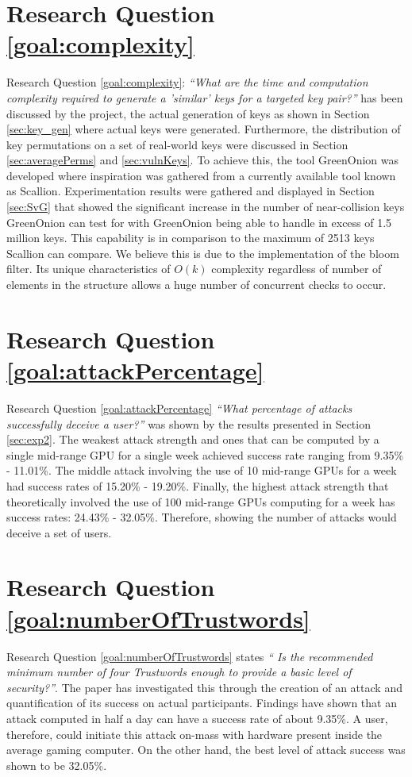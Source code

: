 \section{Research Question \ref{goal:complexity}}
Research Question \ref{goal:complexity}: \textit{``What are the time and computation complexity required to generate a ’similar’ keys for a targeted key pair?''} has been discussed by the project, the actual generation of keys as shown in Section \ref{sec:key_gen} where actual keys were generated. Furthermore, the distribution of key permutations on a set of real-world keys were discussed in Section \ref{sec:averagePerms} and \ref{sec:vulnKeys}. To achieve this, the tool GreenOnion was developed where inspiration was gathered from a currently available tool known as Scallion. Experimentation results were gathered and displayed in Section \ref{sec:SvG} that showed the significant increase in the number of near-collision keys GreenOnion can test for with GreenOnion being able to handle in excess of 1.5 million keys. This capability is in comparison to the maximum of 2513 keys Scallion can compare. We believe this is due to the implementation of the bloom filter. Its unique characteristics of $O(k)$ complexity regardless of number of elements in the structure allows a huge number of concurrent checks to occur. 

\section{Research Question \ref{goal:attackPercentage}}
Research Question \ref{goal:attackPercentage} \textit{``What percentage of attacks successfully deceive a user?''} was shown by the results presented in Section \ref{sec:exp2}. The weakest attack strength and ones that can be computed by a single mid-range GPU for a single week achieved success rate ranging from 9.35\% - 11.01\%. The middle attack involving the use of 10 mid-range GPUs for a week had success rates of 15.20\% - 19.20\%. Finally, the highest attack strength that theoretically involved the use of 100 mid-range GPUs computing for a week has success rates: 24.43\% - 32.05\%. Therefore, showing the number of attacks would deceive a set of users.

\section{Research Question \ref{goal:numberOfTrustwords}}
Research Question \ref{goal:numberOfTrustwords} states \textit{`` Is the recommended minimum number of four Trustwords enough to provide a basic level of security?''}. The paper has investigated this through the creation of an attack and quantification of its success on actual participants. Findings have shown that an attack computed in half a day can have a success rate of about 9.35\%. A user, therefore, could initiate this attack on-mass with hardware present inside the average gaming computer. On the other hand, the best level of attack success was shown to be 32.05\%. 

